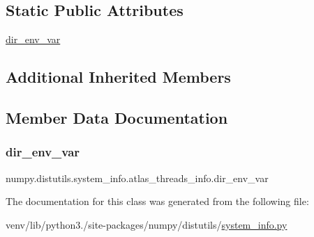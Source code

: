 \subsection*{Static Public Attributes}
\begin{DoxyCompactItemize}
\item 
\hyperlink{classnumpy_1_1distutils_1_1system__info_1_1atlas__threads__info_aa88314f008b6b80a91f70b55ef9f914e}{dir\+\_\+env\+\_\+var}
\end{DoxyCompactItemize}
\subsection*{Additional Inherited Members}


\subsection{Member Data Documentation}
\mbox{\label{classnumpy_1_1distutils_1_1system__info_1_1atlas__threads__info_aa88314f008b6b80a91f70b55ef9f914e}} 
\subsubsection{\texorpdfstring{dir\+\_\+env\+\_\+var}{dir\_env\_var}}
{\footnotesize\ttfamily numpy.\+distutils.\+system\+\_\+info.\+atlas\+\_\+threads\+\_\+info.\+dir\+\_\+env\+\_\+var\hspace{0.3cm}{\ttfamily [static]}}



The documentation for this class was generated from the following file\+:\begin{DoxyCompactItemize}
\item 
venv/lib/python3./site-\/packages/numpy/distutils/\hyperlink{system__info_8py}{system\+\_\+info.\+py}\end{DoxyCompactItemize}
